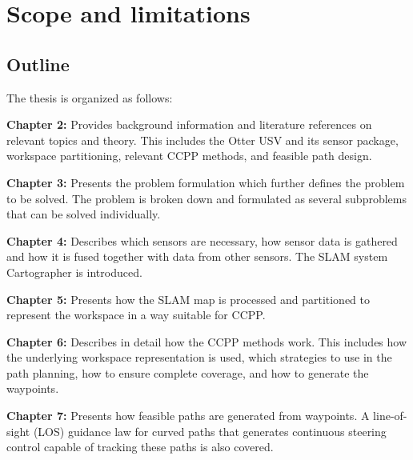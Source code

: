 \section{Scope and limitations}


\subsection{Outline}

The thesis is organized as follows:\vspace{0.4em}

\noindent \textbf{Chapter 2:} Provides background information and literature references on relevant topics and theory. This includes the Otter USV and its sensor package, workspace partitioning, relevant CCPP methods, and feasible path design. 
\vspace{0.4em}

\noindent \textbf{Chapter 3:} Presents the problem formulation which further defines the problem to be solved. The problem is broken down and formulated as several subproblems that can be solved individually.
\vspace{0.4em}

\noindent \textbf{Chapter 4:} Describes which sensors are necessary, how sensor data is gathered and how it is fused together with data from other sensors. The SLAM system Cartographer is introduced.
\vspace{0.4em}

\noindent \textbf{Chapter 5:} Presents how the SLAM map is processed and partitioned to represent the workspace in a way suitable for CCPP.
\vspace{0.4em}

\noindent \textbf{Chapter 6:} Describes in detail how the CCPP methods work. This includes how the underlying workspace representation is used, which strategies to use in the path planning, how to ensure complete coverage, and how to generate the waypoints.
\vspace{0.4em}

\noindent \textbf{Chapter 7:} Presents how feasible paths are generated from waypoints. A line-of-sight (LOS) guidance law for curved paths that generates continuous steering control capable of tracking these paths is also covered.
\vspace{0.4em}

